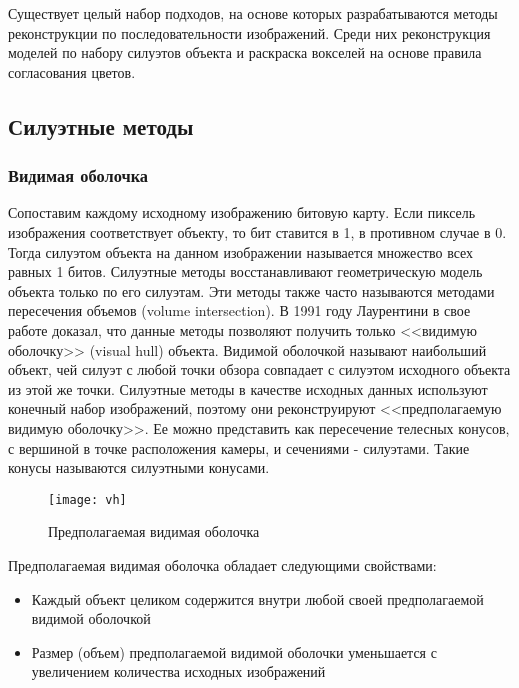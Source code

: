 Существует целый набор подходов, на основе которых разрабатываются методы реконструкции по последовательности изображений. Среди них реконструкция моделей по набору силуэтов объекта и раскраска вокселей на основе правила согласования цветов.

\subsection{Силуэтные методы}
\subsubsection{Видимая оболочка}
Сопоставим каждому исходному изображению битовую карту. Если пиксель изображения соответствует объекту, то бит ставится в 1, в противном случае в 0. Тогда силуэтом объекта на данном изображении называется множество всех равных 1 битов. Силуэтные методы восстанавливают геометрическую модель объекта только по его силуэтам. Эти методы также часто называются методами пересечения объемов (volume intersection). В 1991 году Лаурентини в свое работе доказал, что данные методы позволяют получить только <<видимую оболочку>> (visual hull) объекта. Видимой оболочкой называют наибольший объект, чей силуэт с любой точки обзора совпадает с силуэтом исходного объекта из этой же точки. Силуэтные методы в качестве исходных данных используют конечный набор изображений, поэтому они реконструируют <<предполагаемую видимую оболочку>>. Ее можно представить как пересечение телесных конусов, с вершиной в точке расположения камеры, и сечениями - силуэтами. Такие конусы называются силуэтными конусами.
\renewcommand{\figurename}{Рис.}
\begin{figure}[h]
\center
\texttt{[image: vh]}
\caption{Предполагаемая видимая оболочка}
\end{figure}

Предполагаемая видимая оболочка обладает следующими свойствами:
\begin{itemize}
    \item Каждый объект целиком содержится внутри любой своей предполагаемой видимой оболочкой
    \item Размер (объем) предполагаемой видимой оболочки уменьшается с увеличением количества исходных изображений
\end{itemize}

